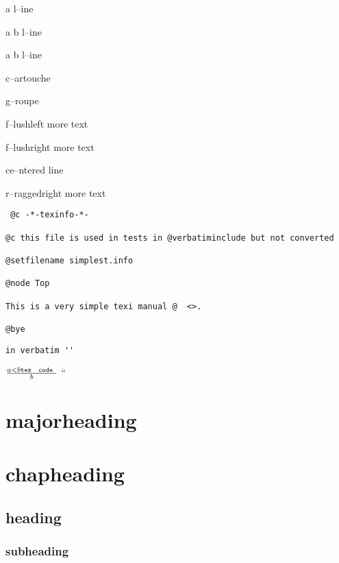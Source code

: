 \documentclass{book}
\newcommand{\GNUTexinfoplaceholder}[1]{}
\newcommand{\GNUTexinfonopagebreakheading}[2]{\let\clearpage\relax \let\cleardoublepage\relax \let\thispagestyle\GNUTexinfoplaceholder #1{#2}}
\begin{document}
\begin{titlepage}
a
l--ine

a
b
l--ine

a
b
l--ine

c--artouche

g--roupe

f--lushleft
more text

f--lushright
more text

\begin{center}
ce--ntered line
\end{center}

\begin{flushleft}
r--raggedright
more text
\end{flushleft}

\begin{verbatim}
 @c -*-texinfo-*-

@c this file is used in tests in @verbatiminclude but not converted

@setfilename simplest.info

@node Top

This is a very simple texi manual @  <>.

@bye
\end{verbatim}

\begin{verbatim}
in verbatim ''
\end{verbatim}





$\frac{a < b \texttt{tex \hbox{ code }}}{b}$ ``

\GNUTexinfonopagebreakheading{\chapter*}{majorheading}

\GNUTexinfonopagebreakheading{\chapter*}{chapheading}

\GNUTexinfonopagebreakheading{\section*}{heading}

\GNUTexinfonopagebreakheading{\subsection*}{subheading}


\end{titlepage}
\end{document}

